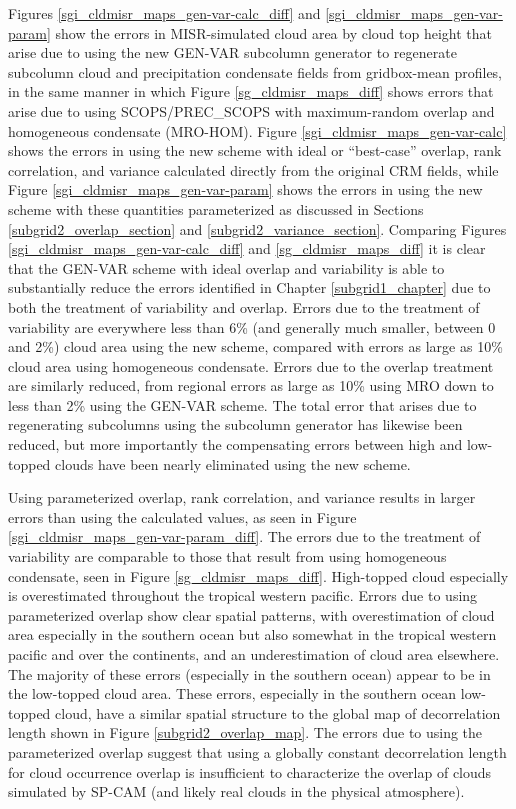 Figures \ref{sgi_cldmisr_maps_gen-var-calc_diff} and \ref{sgi_cldmisr_maps_gen-var-param} show the errors in MISR-simulated cloud area by cloud top height that arise due to using the new GEN-VAR subcolumn generator to regenerate subcolumn cloud and precipitation condensate fields from gridbox-mean profiles, in the same manner in which Figure \ref{sg_cldmisr_maps_diff} shows errors that arise due to using SCOPS/PREC\_SCOPS with maximum-random overlap and homogeneous condensate (MRO-HOM). Figure \ref{sgi_cldmisr_maps_gen-var-calc} shows the errors in using the new scheme with ideal or ``best-case'' overlap, rank correlation, and variance calculated directly from the original CRM fields, while Figure \ref{sgi_cldmisr_maps_gen-var-param} shows the errors in using the new scheme with these quantities parameterized as discussed in Sections \ref{subgrid2_overlap_section} and \ref{subgrid2_variance_section}. Comparing Figures \ref{sgi_cldmisr_maps_gen-var-calc_diff} and \ref{sg_cldmisr_maps_diff} it is clear that the GEN-VAR scheme with ideal overlap and variability is able to substantially reduce the errors identified in Chapter \ref{subgrid1_chapter} due to both the treatment of variability and overlap. Errors due to the treatment of variability are everywhere less than 6\% (and generally much smaller, between 0 and 2\%) cloud area using the new scheme, compared with errors as large as 10\% cloud area using homogeneous condensate. Errors due to the overlap treatment are similarly reduced, from regional errors as large as 10\% using MRO down to less than 2\% using the GEN-VAR scheme. The total error that arises due to regenerating subcolumns using the subcolumn generator has likewise been reduced, but more importantly the compensating errors between high and low-topped clouds have been nearly eliminated using the new scheme.

Using parameterized overlap, rank correlation, and variance results in larger errors than using the calculated values, as seen in Figure \ref{sgi_cldmisr_maps_gen-var-param_diff}. The errors due to the treatment of variability are comparable to those that result from using homogeneous condensate, seen in Figure \ref{sg_cldmisr_maps_diff}. High-topped cloud especially is overestimated throughout the tropical western pacific. Errors due to using parameterized overlap show clear spatial patterns, with overestimation of cloud area especially in the southern ocean but also somewhat in the tropical western pacific and over the continents, and an underestimation of cloud area elsewhere. The majority of these errors (especially in the southern ocean) appear to be in the low-topped cloud area. These errors, especially in the southern ocean low-topped cloud, have a similar spatial structure to the global map of decorrelation length shown in Figure \ref{subgrid2_overlap_map}. The errors due to using the parameterized overlap suggest that using a globally constant decorrelation length for cloud occurrence overlap is insufficient to characterize the overlap of clouds simulated by SP-CAM (and likely real clouds in the physical atmosphere). 

